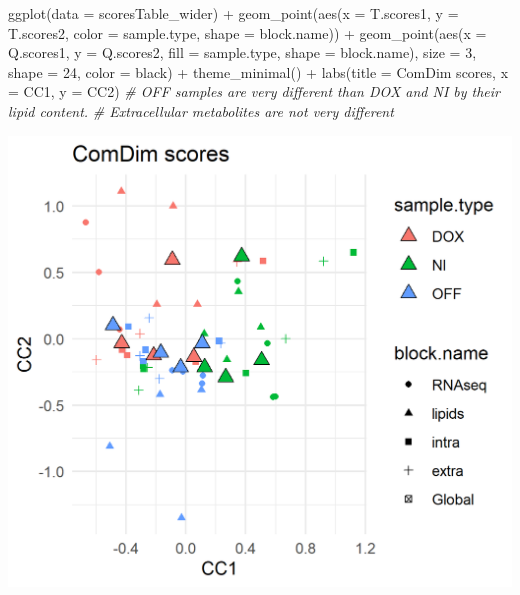 \documentclass[
]{book}
\newenvironment{Shaded}{\begin{snugshade}}{\end{snugshade}}
\newcommand{\AttributeTok}[1]{\textcolor[rgb]{0.77,0.63,0.00}{#1}}
\newcommand{\CommentTok}[1]{\textcolor[rgb]{0.56,0.35,0.01}{\textit{#1}}}
\newcommand{\DecValTok}[1]{\textcolor[rgb]{0.00,0.00,0.81}{#1}}
\newcommand{\FunctionTok}[1]{\textcolor[rgb]{0.00,0.00,0.00}{#1}}
\newcommand{\NormalTok}[1]{#1}
\newcommand{\SpecialCharTok}[1]{\textcolor[rgb]{0.00,0.00,0.00}{#1}}
\newcommand{\StringTok}[1]{\textcolor[rgb]{0.31,0.60,0.02}{#1}}
\begin{document}
\begin{Shaded}
\begin{Highlighting}[]
\FunctionTok{ggplot}\NormalTok{(}\AttributeTok{data =}\NormalTok{ scoresTable\_wider) }\SpecialCharTok{+}
  \FunctionTok{geom\_point}\NormalTok{(}\FunctionTok{aes}\NormalTok{(}\AttributeTok{x =}\NormalTok{ T.scores1, }\AttributeTok{y =}\NormalTok{ T.scores2, }\AttributeTok{color =}\NormalTok{ sample.type,}
                 \AttributeTok{shape =}\NormalTok{ block.name)) }\SpecialCharTok{+}
  \FunctionTok{geom\_point}\NormalTok{(}\FunctionTok{aes}\NormalTok{(}\AttributeTok{x =}\NormalTok{ Q.scores1, }\AttributeTok{y =}\NormalTok{ Q.scores2,}
                 \AttributeTok{fill =}\NormalTok{ sample.type, }\AttributeTok{shape =}\NormalTok{ block.name),}
             \AttributeTok{size =} \DecValTok{3}\NormalTok{, }\AttributeTok{shape =} \DecValTok{24}\NormalTok{, }\AttributeTok{color =} \StringTok{\textquotesingle{}black\textquotesingle{}}\NormalTok{) }\SpecialCharTok{+}
  \FunctionTok{theme\_minimal}\NormalTok{() }\SpecialCharTok{+}
  \FunctionTok{labs}\NormalTok{(}\AttributeTok{title =} \StringTok{\textquotesingle{}ComDim scores\textquotesingle{}}\NormalTok{, }\AttributeTok{x =} \StringTok{\textquotesingle{}CC1\textquotesingle{}}\NormalTok{, }\AttributeTok{y =} \StringTok{\textquotesingle{}CC2\textquotesingle{}}\NormalTok{)}
  \CommentTok{\# OFF samples are very different than DOX and NI by their lipid content.}
  \CommentTok{\# Extracellular metabolites are not very different}
\end{Highlighting}
\end{Shaded}

\includegraphics{Figs/fig4_2.png}
\end{document}
